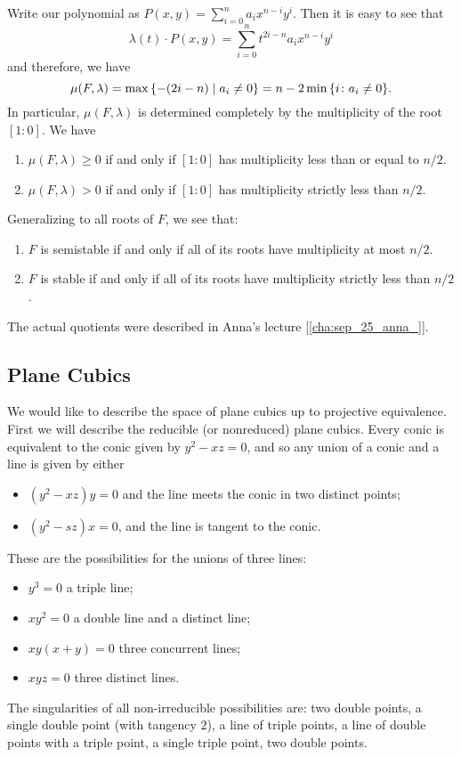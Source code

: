 \documentclass[leqno, openany]{memoir}
\theoremstyle{definition}
\theoremstyle{remark}
\theoremstyle{plain}
\theoremstyle{definition}
\theoremstyle{remark}
\begin{document}
Write our polynomial as $P(x,y) = \sum_{i=0}^n a_i x^{n-i} y^{i}$. Then it is
easy to see that \[ \lambda(t) \cdot P(x,y) = \sum_{i=0}^n t^{2i-n} a_i x^{n-i}
    y^{i} \] and therefore, we have \[ \mu(F, \lambda) = \max \qty{-(2i-n) \mid
a_i \neq 0} = n - 2 \min \qty{i \colon a_i \neq 0}. \] In particular, $\mu(F,
\lambda)$ is determined completely by the multiplicity of the root $[1:0]$. We
have \begin{enumerate} \item $\mu(F, \lambda) \geq 0$ if and only if $[1:0]$
    has multiplicity less than or equal to $n/2$.  \item $\mu(F, \lambda) > 0$
if and only if $[1:0]$ has multiplicity strictly less than $n/2$.
\end{enumerate} Generalizing to all roots of $F$, we see that:
\begin{enumerate} \item $F$ is semistable if and only if all of its roots have
    multiplicity at most $n/2$.  \item $F$ is stable if and only if all of its
    roots have multiplicity strictly less than $n/2$.  \end{enumerate} The
    actual quotients were described in Anna's lecture
    [\autoref{cha:sep_25_anna_}].

\subsection{Plane Cubics}%

We would like to describe the space of plane cubics up to projective
equivalence. First we will describe the reducible (or nonreduced) plane cubics.
Every conic is equivalent to the conic given by $y^2 - xz = 0$, and so any
union of a conic and a line is given by either \begin{itemize} \item $(y^2 -
xz)y = 0$ and the line meets the conic in two distinct points; \item $(y^2 -
sz)x = 0$, and the line is tangent to the conic.  \end{itemize} These are the
possibilities for the unions of three lines: \begin{itemize} \item $y^3 = 0$ a
triple line; \item $xy^2 = 0$ a double line and a distinct line; \item $xy(x+y)
= 0$ three concurrent lines; \item $xyz = 0$ three distinct lines.
\end{itemize} The singularities of all non-irreducible possibilities are: two
double points, a single double point (with tangency $2$), a line of triple
points, a line of double points with a triple point, a single triple point, two
double points.
\end{document}

